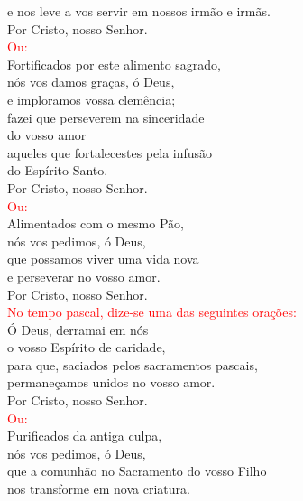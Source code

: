 \documentclass{book}
\begin{document}
\begin{flushleft}
    e nos leve a vos servir em nossos irmão e irmãs. \\
    Por Cristo, nosso Senhor.
    \vspace{.1cm} \\
    \textcolor{red}{Ou:}
    \vspace{.1cm} \\
    Fortificados por este alimento sagrado, \\
    nós vos damos graças, ó Deus, \\
    e imploramos vossa clemência; \\
    fazei que perseverem na sinceridade \\
    do vosso amor \\
    aqueles que fortalecestes pela infusão \\
    do Espírito Santo. \\
    Por Cristo, nosso Senhor.
    \vspace{.1cm} \\
    \textcolor{red}{Ou:}
    \vspace{.1cm} \\
    Alimentados com o mesmo Pão, \\
    nós vos pedimos, ó Deus, \\
    que possamos viver uma vida nova \\
    e perseverar no vosso amor. \\
    Por Cristo, nosso Senhor.
    \vspace{.1cm} \\
    \textcolor{red}{No tempo pascal, dize-se uma das seguintes orações:}
    \vspace{.1cm} \\
    Ó Deus, derramai em nós \\
    o vosso Espírito de caridade, \\
    para que, saciados pelos sacramentos pascais, \\
    permaneçamos unidos no vosso amor. \\
    Por Cristo, nosso Senhor.
    \vspace{.1cm} \\
    \textcolor{red}{Ou:}
    \vspace{.1cm} \\
    Purificados da antiga culpa, \\
    nós vos pedimos, ó Deus, \\
    que a comunhão no Sacramento do vosso Filho \\
    nos transforme em nova criatura.

\end{flushleft}
\end{document}
